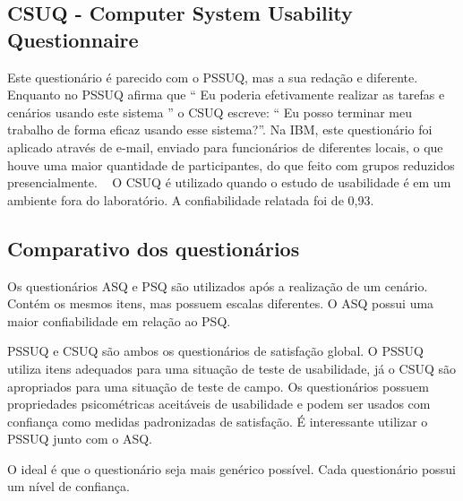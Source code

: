 \subsection{CSUQ - Computer System Usability Questionnaire}

	Este questionário é parecido com o PSSUQ, mas a sua redação e diferente. Enquanto no PSSUQ afirma que “ Eu poderia efetivamente realizar as tarefas e cenários usando este sistema ” o CSUQ escreve: “ Eu posso terminar meu trabalho de forma eficaz usando esse sistema?”. Na IBM, este questionário foi aplicado através de e-mail, enviado para funcionários de diferentes locais, o que houve uma maior quantidade de participantes, do que feito com grupos reduzidos presencialmente. ~\cite{lewis1995ibm} 
	O CSUQ é utilizado quando o estudo de usabilidade é em um ambiente fora do laboratório. A confiabilidade relatada foi de 0,93.

\newpage

\subsection{Comparativo dos questionários}

	Os questionários ASQ e PSQ são utilizados após a realização de um cenário. Contém os mesmos itens, mas possuem escalas diferentes. O ASQ possui uma maior confiabilidade em relação ao PSQ. 

	PSSUQ e CSUQ são ambos os questionários de satisfação global. O PSSUQ utiliza itens adequados para uma situação de teste de usabilidade, já o CSUQ são apropriados para uma situação de teste de campo. Os questionários possuem propriedades psicométricas aceitáveis de usabilidade e podem ser usados com confiança como medidas padronizadas de satisfação. É interessante utilizar o PSSUQ junto com o ASQ.

	O ideal é que o questionário seja mais genérico possível. Cada questionário possui um nível de confiança.

